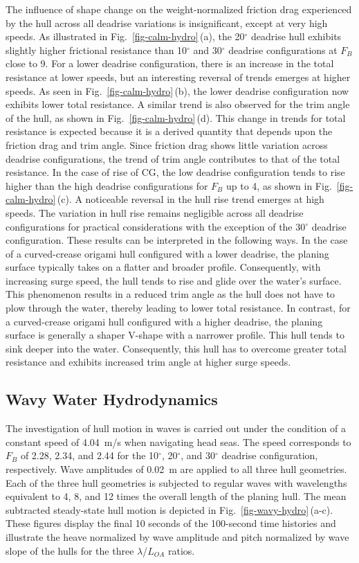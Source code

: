 The influence of shape change on the weight-normalized friction drag experienced by the hull across all deadrise variations is insignificant, except at very high speeds. As illustrated in Fig.~\ref{fig-calm-hydro}\,(a), the 20\(^\circ\) deadrise hull exhibits slightly higher frictional resistance than 10\(^\circ\) and 30\(^\circ\) deadrise configurations at \(F_B\) close to 9. For a lower deadrise configuration, there is an increase in the total resistance at lower speeds, but an interesting reversal of trends emerges at higher speeds. As seen in Fig.~\ref{fig-calm-hydro}\,(b), the lower deadrise configuration now exhibits lower total resistance. A similar trend is also observed for the trim angle of the hull, as shown in Fig.~\ref{fig-calm-hydro}\,(d). This change in trends for total resistance is expected because it is a derived quantity that depends upon the friction drag and trim angle. Since friction drag shows little variation across deadrise configurations, the trend of trim angle contributes to that of the total resistance. In the case of rise of CG, the low deadrise configuration tends to rise higher than the high deadrise configurations for \(F_B\) up to 4, as shown in Fig.~\ref{fig-calm-hydro}\,(c). A noticeable reversal in the hull rise trend emerges at high speeds. The variation in hull rise remains negligible across all deadrise configurations for practical considerations with the exception of the 30\(^\circ\) deadrise configuration. These results can be interpreted in the following ways. In the case of a curved-crease origami hull configured with a lower deadrise, the planing surface typically takes on a flatter and broader profile. Consequently, with increasing surge speed, the hull tends to rise and glide over the water's surface. This phenomenon results in a reduced trim angle as the hull does not have to plow through the water, thereby leading to lower total resistance. In contrast, for a curved-crease origami hull configured with a higher deadrise, the planing surface is generally a shaper V-shape with a narrower profile. This hull tends to sink deeper into the water. Consequently, this hull has to overcome greater total resistance and exhibits increased trim angle at higher surge speeds.

\subsection{Wavy Water Hydrodynamics}\label{05-subsec-wavy-hydro}
The investigation of hull motion in waves is carried out under the condition of a constant speed of 4.04~m/s when navigating head seas. The speed corresponds to \(F_B\) of 2.28, 2.34, and 2.44 for the 10\(^{\circ}\), 20\(^{\circ}\), and 30\(^{\circ}\) deadrise configuration, respectively. Wave amplitudes of 0.02~m are applied to all three hull geometries. Each of the three hull geometries is subjected to regular waves with wavelengths equivalent to 4, 8, and 12 times the overall length of the planing hull. The mean subtracted steady-state hull motion is depicted in Fig.~\ref{fig-wavy-hydro}\,(a-c). These figures display the final 10 seconds of the 100-second time histories and illustrate the heave normalized by wave amplitude and pitch normalized by wave slope of the hulls for the three \(\lambda\)/\(L_{OA}\) ratios.

